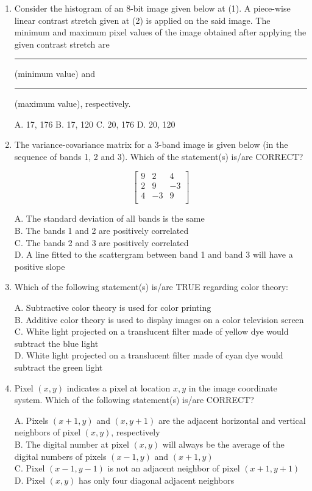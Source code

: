 \documentclass[journal,12pt,onecolumn]{IEEEtran}
\begin{document}
\begin{enumerate}
    \item Consider the histogram of an 8-bit image given below at (1). A piece-wise linear contrast stretch given at (2) is applied on the said image. The minimum and maximum pixel values of the image obtained after applying the given contrast stretch are \rule{3cm}{0.15mm} (minimum value) and \rule{3cm}{0.15mm} (maximum value), respectively.

    A. 17, 176 \quad
    B. 17, 120 \quad
    C. 20, 176 \quad
    D. 20, 120

    \item The variance-covariance matrix for a 3-band image is given below (in the sequence of bands 1, 2 and 3). Which of the statement(s) is/are CORRECT?

\[
\begin{bmatrix}
9 & 2 & 4 \\
2 & 9 & -3 \\
4 & -3 & 9 \\
\end{bmatrix}
\]

    A. The standard deviation of all bands is the same \\
    B. The bands 1 and 2 are positively correlated \\
    C. The bands 2 and 3 are positively correlated \\
    D. A line fitted to the scattergram between band 1 and band 3 will have a positive slope

    \item Which of the following statement(s) is/are TRUE regarding color theory:

    A. Subtractive color theory is used for color printing \\
    B. Additive color theory is used to display images on a color television screen \\
    C. White light projected on a translucent filter made of yellow dye would subtract the blue light \\
    D. White light projected on a translucent filter made of cyan dye would subtract the green light

    \item Pixel $(x, y)$ indicates a pixel at location $x, y$ in the image coordinate system. Which of the following statement(s) is/are CORRECT?

    A. Pixels $(x+1, y)$ and $(x, y+1)$ are the adjacent horizontal and vertical neighbors of pixel $(x, y)$, respectively \\
    B. The digital number at pixel $(x, y)$ will always be the average of the digital numbers of pixels $(x-1, y)$ and $(x+1, y)$ \\
    C. Pixel $(x-1, y-1)$ is not an adjacent neighbor of pixel $(x+1, y+1)$ \\
    D. Pixel $(x, y)$ has only four diagonal adjacent neighbors


\end{enumerate}
\end{document}
